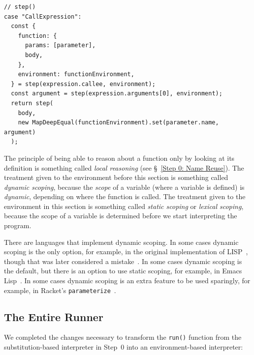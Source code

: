 \documentclass[12pt, oneside]{book}
\begin{document}
\begin{verbatim}
// step()
case "CallExpression":
  const {
    function: {
      params: [parameter],
      body,
    },
    environment: functionEnvironment,
  } = step(expression.callee, environment);
  const argument = step(expression.arguments[0], environment);
  return step(
    body,
    new MapDeepEqual(functionEnvironment).set(parameter.name, argument)
  );
\end{verbatim}

\begin{mdframed}[frametitle = {Technical Terms}]
The principle of being able to reason about a function only by looking at its definition is something called \emph{local reasoning} (see §~\ref{Step 0: Name Reuse}). The treatment given to the environment before this section is something called \emph{dynamic scoping}, because the \emph{scope} of a variable (where a variable is defined) is \emph{dynamic}, depending on where the function is called. The treatment given to the environment in this section is something called \emph{static scoping} or \emph{lexical scoping}, because the scope of a variable is determined before we start interpreting the program.
\end{mdframed}

\begin{mdframed}[frametitle = {Advanced}]
There are languages that implement dynamic scoping. In some cases dynamic scoping is the only option, for example, in the original implementation of LISP~\cite{lisp-original}, though that was later considered a mistake~\cite{lisp-history}. In some cases dynamic scoping is the default, but there is an option to use static scoping, for example, in Emacs Lisp~\cite[§~12.10]{emacs-lisp}. In some cases dynamic scoping is an extra feature to be used sparingly, for example, in Racket’s \texttt{parameterize}~\cite[§~4.13]{racket-guide}.
\end{mdframed}

\subsection{The Entire Runner}

We completed the changes necessary to transform the \texttt{run()} function from the substitution-based interpreter in Step~0 into an environment-based interpreter:
\end{document}
